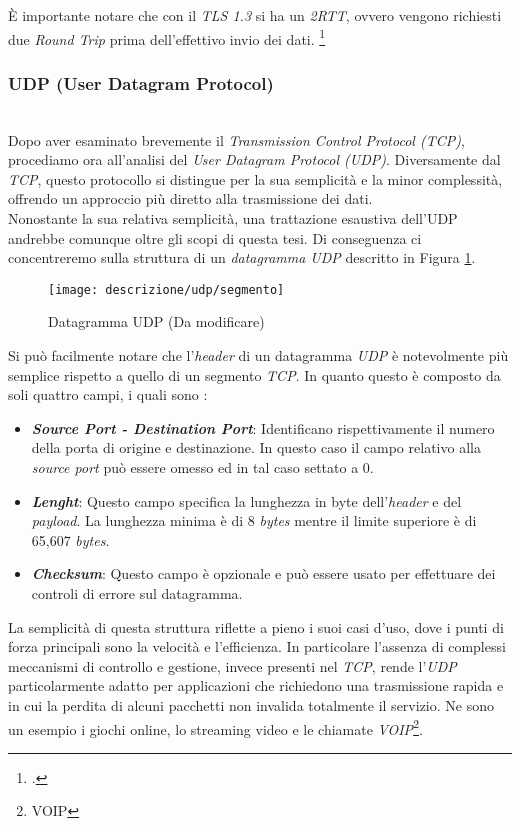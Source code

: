 \noindent È importante notare che con il \emph{TLS 1.3} si ha un \emph{2RTT}, ovvero vengono richiesti due \emph{Round Trip} prima dell'effettivo invio dei dati. 
\footcite{womak:lean-thinking}
\subsubsection{UDP (User Datagram Protocol)}
~\\
\indent Dopo aver esaminato brevemente il \emph{Transmission Control Protocol (TCP)},
procediamo ora all'analisi del \emph{User Datagram Protocol (UDP)}. 
Diversamente dal \emph{TCP}, questo protocollo si distingue per la sua semplicità e la minor complessità, offrendo un approccio più diretto alla trasmissione dei dati.
\\
Nonostante la sua relativa semplicità, una trattazione esaustiva dell'UDP andrebbe comunque oltre gli scopi di questa tesi. 
Di conseguenza ci concentreremo sulla struttura di un \emph{datagramma {UDP}} descritto in Figura \ref{udp-datagram}.
\\
\begin{figure}[!h]
    \centering
    \texttt{[image: descrizione/udp/segmento]}
    \caption{Datagramma UDP (Da modificare)}
    \label{udp-datagram}
\end{figure}

\noindent Si può facilmente notare che l'\emph{header} di un datagramma \emph{UDP} è notevolmente più semplice rispetto a quello di un segmento \emph{TCP}.
In quanto questo è composto da soli quattro campi, i quali sono :  
\begin{itemize}
    \item \textit{\textbf{Source Port - Destination Port}}: Identificano rispettivamente il numero della porta di origine e destinazione. In questo caso il campo relativo alla \emph{source port} può essere omesso ed in tal caso settato a 0.
    \item \textit{\textbf{Lenght}}: Questo campo specifica la lunghezza in byte dell'\emph{header} e del \emph{payload}. La lunghezza minima è di 8 \emph{bytes} mentre il limite superiore è di 65,607 \emph{bytes}.
    \item \textit{\textbf{Checksum}}: Questo campo è opzionale e può essere usato per effettuare dei controli di errore sul datagramma.
\end{itemize}

\noindent La semplicità di questa struttura riflette a pieno i suoi casi d'uso, dove i punti di forza principali sono la velocità e l'efficienza.
In particolare l'assenza di complessi meccanismi di controllo e gestione, invece presenti nel \emph{TCP}, rende l'\emph{UDP} particolarmente adatto per applicazioni che richiedono una trasmissione rapida e in cui la perdita di alcuni pacchetti non invalida totalmente il servizio.
Ne sono un esempio i giochi online, lo streaming video e le chiamate \emph{VOIP}\footnote{\gls{VOIP}}.

